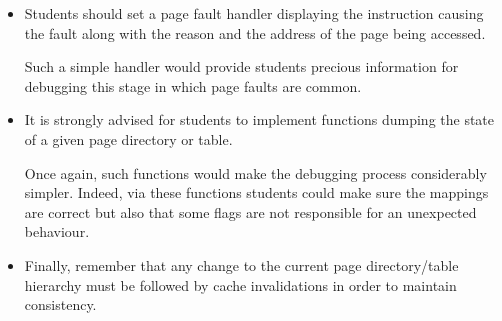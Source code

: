 \begin{itemize}
  \item
    Students should set a page fault handler displaying the instruction causing
    the fault along with the reason and the address of the page being accessed.

    \-

    Such a simple handler would provide students precious information for
    debugging this stage in which page faults are common.
  \item
    It is strongly advised for students to implement functions dumping the
    state of a given page directory or table.

    \-

    Once again, such functions would make the debugging process considerably
    simpler. Indeed, via these functions students could make sure the mappings
    are correct but also that some flags are not responsible for an
    unexpected behaviour.
  \item
    Finally, remember that any change to the current page directory/table
    hierarchy must be followed by cache invalidations in order to maintain
    consistency.
\end{itemize}
